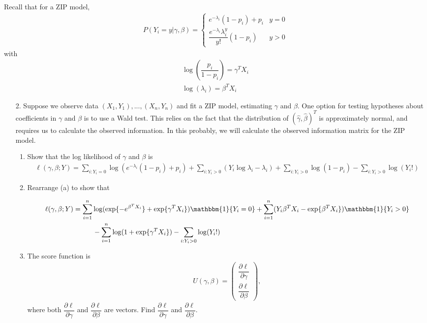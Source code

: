 \documentclass[11pt]{article}
\begin{document}
Recall that for a ZIP model,
\begin{align*}
P(Y_i = y | \gamma, \beta) = \begin{cases}
e^{-\lambda_i}(1 - p_i) + p_i & y = 0 \\
\dfrac{e^{-\lambda_i} \lambda_i^y}{y!}(1 - p_i) & y > 0
\end{cases}
\end{align*}
with 
\begin{align*}
\log \left( \dfrac{p_i}{1 - p_i} \right) = \gamma^T X_i \\
\log(\lambda_i) = \beta^T X_i
\end{align*}

\begin{enumerate}
\item[2.] Suppose we observe data $(X_1,Y_1),...,(X_n,Y_n)$ and fit a ZIP model, estimating $\gamma$ and $\beta$. One option for testing hypotheses about coefficients in $\gamma$ and $\beta$ is to use a Wald test. This relies on the fact that the distribution of $(\widehat{\gamma}, \widehat{\beta})^T$ is approximately normal, and requires us to calculate the observed information. In this probably, we will calculate the observed information matrix for the ZIP model.

\begin{enumerate}
\item Show that the log likelihood of $\gamma$ and $\beta$ is
\begin{align*}
\ell(\gamma, \beta; Y) = \sum \limits_{i: Y_i = 0} \log \left( e^{-\lambda_i}(1 - p_i) + p_i \right) + \sum \limits_{i: Y_i > 0} (Y_i \log \lambda_i - \lambda_i) + \sum \limits_{i: Y_i > 0} \log(1 - p_i) - \sum_{i: Y_i > 0} \log(Y_i!)
\end{align*}

\item Rearrange (a) to show that

\begin{align*}
\ell(\gamma, \beta; Y) &= \sum \limits_{i=1}^n \log( \exp\{ -e^{\beta^T X_i} \} + \exp\{\gamma^T X_i\}) \mathbbm{1}\{Y_i = 0\} + \sum \limits_{i=1}^n(Y_i \beta^T X_i - \exp\{ \beta^T X_i \}) \mathbbm{1}\{Y_i > 0\} \\
& \hspace{1cm} - \sum \limits_{i=1}^n \log(1 + \exp\{\gamma^T X_i\}) - \sum \limits_{i: Y_i > 0} \log(Y_i!)
\end{align*}

\item The score function is 
\renewcommand*{\arraystretch}{2}
\begin{align*}
U(\gamma, \beta) = \begin{pmatrix}
\dfrac{\partial \ell}{\partial \gamma} \\
\dfrac{\partial \ell}{\partial \beta}
\end{pmatrix},
\end{align*}
where both $\dfrac{\partial \ell}{\partial \gamma}$ and $\dfrac{\partial \ell}{\partial \beta}$ are vectors. Find $\dfrac{\partial \ell}{\partial \gamma}$ and $\dfrac{\partial \ell}{\partial \beta}$.


\end{enumerate}
\end{enumerate}
\end{document}
